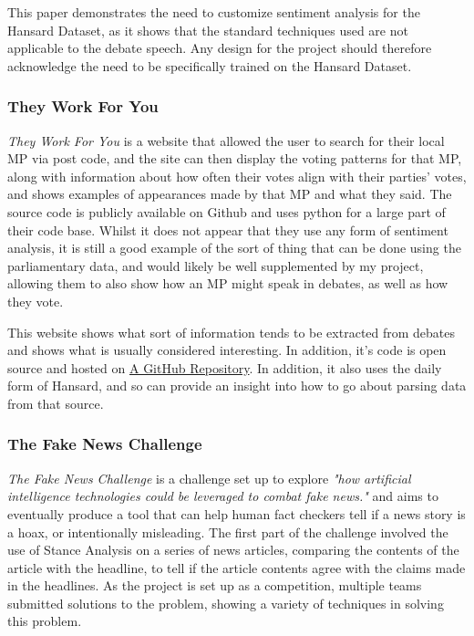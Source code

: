 This paper demonstrates the need to customize sentiment analysis for the Hansard Dataset, as it shows that the standard techniques used are not applicable to the debate speech. Any design for the project should therefore acknowledge the need to be specifically trained on the Hansard Dataset.

\subsubsection{They Work For You}
\emph{They Work For You}\cite{mySociety} is a website that allowed the user to search for their local MP via post code, and the site can then display the voting patterns for that MP, along with information about how often their votes align with their parties' votes, and shows examples of appearances made by that MP and what they said. The source code is publicly available on Github and uses python for a large part of their code base. Whilst it does not appear that they use any form of sentiment analysis, it is still a good example of the sort of thing that can be done using the parliamentary data, and would likely be well supplemented by my project, allowing them to also show how an MP might speak in debates, as well as how they vote.

This website shows what sort of information tends to be extracted from debates and shows what is usually considered interesting. In addition, it's code is open source and hosted on \href{https://github.com/mysociety/theyworkforyou}{A GitHub Repository}. In addition, it also uses the daily form of Hansard, and so can provide an insight into how to go about parsing data from that source.

\subsubsection{The Fake News Challenge}
\emph{The Fake News Challenge}\cite{FakeNewsChallenge2017} is a challenge set up to explore \emph{"how artificial intelligence technologies could be leveraged to combat fake news."} and aims to eventually produce a tool that can help human fact checkers tell if a news story is a hoax, or intentionally misleading. The first part of the challenge involved the use of Stance Analysis on a series of news articles, comparing the contents of the article with the headline, to tell if the article contents agree with the claims made in the headlines. As the project is set up as a competition, multiple teams submitted solutions to the problem, showing a variety of techniques in solving this problem.

